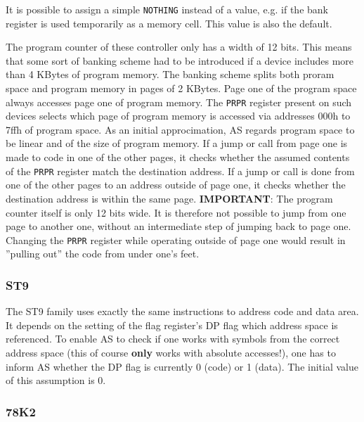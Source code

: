 \documentclass[12pt,twoside]{report}
\newcommand{\bb}[1]{{\bf #1}}
\newcommand{\tty}[1]{{\tt #1}}
\newcommand{\asname}{{AS}}
\begin{document}
It is possible to assign a simple \tty{NOTHING} instead of a value, e.g.
if the bank register is used temporarily as a memory cell.  This value is
also the default.

The program counter of these controller only has a width of 12 bits.  This
means that some sort of banking scheme had to be introduced if a device
includes more than 4 KBytes of program memory.  The banking scheme splits
both proram space and program memory in pages of 2 KBytes.  Page one of the
program space always accesses page one of program memory.  The \tty{PRPR}
register present on such devices selects which page of program memory is
accessed via addresses 000h to 7ffh of program space.  As an initial
approcimation, \asname{} regards program space to be linear and of the size of
program memory.  If a jump or call from page one is made to code in one
of the other pages, it checks whether the assumed contents of the \tty{PRPR}
register match the destination address.  If a jump or call is done from
one of the other pages to an address outside of page one, it checks whether
the destination address is within the same page.  {\bf IMPORTANT}: The
program counter itself is only 12 bits wide.  It is therefore not possible
to jump from one page to another one, without an intermediate step of
jumping back to page one.  Changing the \tty{PRPR} register while operating
outside of page one would result in ''pulling out'' the code from under
one's feet.


\subsubsection{ST9}

The ST9 family uses exactly the same instructions to address code and
data area.  It depends on the setting of the flag register's DP flag
which address space is referenced.  To enable \asname{} to check if one
works with symbols from the correct address space (this of course
\bb{only} works with absolute accesses!), one has to inform \asname{} whether the
DP flag is currently 0 (code) or 1 (data).  The initial value of this
assumption is 0.


\subsubsection{78K2}
\end{document}
